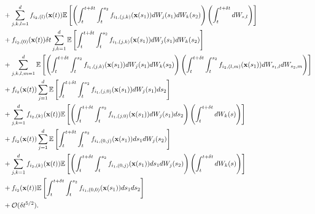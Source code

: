 \begin{equation}
\begin{aligned}
&+  \sum_{j, k, l=1}^d  f_{{i_2},(l)}(\mathbf{x}(t))\mathbb{E} \left[ \left( \int_t^{t+\delta t} \int_t^{s_2} f_{{i_1},(j,k)}(\mathbf{x}(s_1)) dW_j(s_1) dW_k(s_2) \right) \left( \int_t^{t + \delta t} dW_{s,l} \right) \right] \\
&+ f_{{i_2},(0)}(\mathbf{x}(t)) \delta t  \sum_{j, k=1}^d \mathbb{E} \left[ \int_t^{t+\delta t} \int_t^{s_2} f_{{i_1},(j,k)}(\mathbf{x}(s_1)) dW_j(s_1) dW_k(s_2) \right]  \\
&+ \sum_{j, k, l, m=1}^d \mathbb{E} \left[ \left( \int_t^{t+\delta t} \int_t^{s_2} f_{{i_1},(j,k)}(\mathbf{x}(s_1)) dW_j(s_1) dW_k(s_2) \right) \left( \int_t^{t+\delta t} \int_t^{s_2} f_{{i_2},(l,m)}(\mathbf{x}(s_1)) dW_{s_1, l} dW_{s_2, m} \right) \right] \\
&+ f_{i_2}(\mathbf{x}(t)) \sum_{j=1}^d \mathbb{E} \left[ \int_t^{t+\delta t} \int_t^{s_2} f_{{i_1},(j,0)}(\mathbf{x}(s_1)) dW_j(s_1) ds_2  \right]  \\
&+  \sum_{j, k=1}^d f_{{i_2},(k)}(\mathbf{x}(t)) \mathbb{E} \left[ \left( \int_t^{t+\delta t} \int_t^{s_2} f_{{i_1},(j,0)}(\mathbf{x}(s_1)) dW_j(s_1) ds_2  \right) \left( \int_t^{t + \delta t} dW_k(s) \right) \right]\\
&+ f_{i_2}(\mathbf{x}(t))  \sum_{j=1}^d \mathbb{E} \left[ \int_t^{t+\delta t} \int_t^{s_2} f_{{i_1},(0,j)}(\mathbf{x}(s_1)) ds_1 dW_j(s_2)  \right]  \\
&+   \sum_{j, k=1}^d  f_{{i_2},(k)}(\mathbf{x}(t)) \mathbb{E} \left[ \left( \int_t^{t+\delta t} \int_t^{s_2} f_{{i_1},(0,j)}(\mathbf{x}(s_1)) ds_1 dW_j(s_2)  \right) \left(\int_t^{t + \delta t} dW_k(s) \right) \right] \\
&+ f_{i_2}(\mathbf{x}(t)) \mathbb{E} \left[ \int_t^{t+\delta t} \int_t^{s_2} f_{{i_1},(0,0)}(\mathbf{x}(s_1)) ds_1 ds_2 \right]  \\
&+ \mathcal{O} (\delta t^{5/2}).
\end{aligned}
\end{equation}

